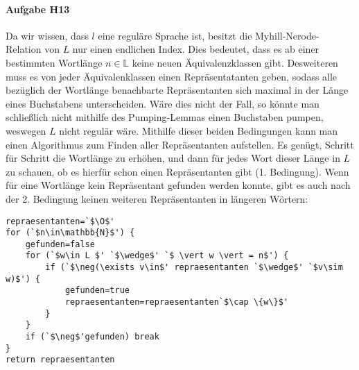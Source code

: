 \documentclass[11pt]{article}
\begin{document}


%
%
\paragraph{Aufgabe H13}
Da wir wissen, dass $l$ eine reguläre Sprache ist, besitzt die Myhill-Nerode-Relation von $L$ nur einen endlichen Index. Dies bedeutet, dass es ab einer bestimmten Wortlänge $n\in\mathbb{L}$ keine neuen Äquivalenzklassen gibt. Desweiteren muss es von jeder Äquivalenklassen einen Repräsentatanten geben, sodass alle bezüglich der Wortlänge benachbarte Repräsentanten sich maximal in der Länge eines Buchstabens unterscheiden. Wäre dies nicht der Fall, so könnte man schließlich nicht mithilfe des Pumping-Lemmas einen Buchstaben pumpen, weswegen $L$ nicht regulär wäre. Mithilfe dieser beiden Bedingungen kann man einen Algorithmus zum Finden aller Repräsentanten aufstellen. Es genügt, Schritt für Schritt die Wortlänge zu erhöhen, und dann für jedes Wort dieser Länge in $L$ zu schauen, ob es hierfür schon einen Repräsentanten gibt (1. Bedingung). Wenn für eine Wortlänge kein Repräsentant gefunden werden konnte, gibt es auch nach der 2. Bedingung keinen weiteren Repräsentanten in längeren Wörtern:
\begin{lstlisting}[escapeinside=`']
repraesentanten=`$\O$'
for (`$n\in\mathbb{N}$') {
	gefunden=false
	for (`$w\in L $' `$\wedge$' `$ \vert w \vert = n$') {
		if (`$\neg(\exists v\in$' repraesentanten `$\wedge$' `$v\sim w)$') {
			gefunden=true
			repraesentanten=repraesentanten`$\cap \{w\}$'
		}
	}
	if (`$\neg$'gefunden) break
}
return repraesentanten
\end{lstlisting}

%
%
\end{document}
